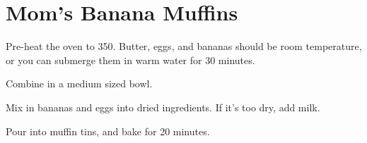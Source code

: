 \section{Mom's Banana Muffins}
\begin{recipe}


Pre-heat the oven to 350\degree{}. 
Butter, eggs, and bananas should be room temperature, or you
can submerge them in warm water for 30 minutes. 


Combine in a medium sized bowl.


Mix in bananas and eggs into dried ingredients. If it's 
too dry, add milk. 

Pour into muffin tins, and bake for 20 minutes. 

\end{recipe}
